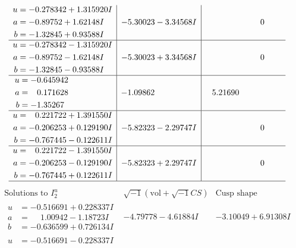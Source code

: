 \documentclass[1p]{elsarticle_modified}
\theoremstyle{definition}
\newcommand{\I}{\sqrt{-1}}
\begin{document}
$$\begin{array}{c|c|c}
\begin{aligned}
u &= -0.278342 + 1.315920 I \\
a &= -0.89752 + 1.62148 I \\
b &= -1.32845 + 0.93588 I\end{aligned}
 & -5.30023 - 3.34568 I & \phantom{-0.000000 } 0 \\ \hline\begin{aligned}
u &= -0.278342 - 1.315920 I \\
a &= -0.89752 - 1.62148 I \\
b &= -1.32845 - 0.93588 I\end{aligned}
 & -5.30023 + 3.34568 I & \phantom{-0.000000 } 0 \\ \hline\begin{aligned}
u &= -0.645942\phantom{ +0.000000I} \\
a &= \phantom{-}0.171628\phantom{ +0.000000I} \\
b &= -1.35267\phantom{ +0.000000I}\end{aligned}
 & -1.09862\phantom{ +0.000000I} & \phantom{-}5.21690\phantom{ +0.000000I} \\ \hline\begin{aligned}
u &= \phantom{-}0.221722 + 1.391550 I \\
a &= -0.206253 + 0.129190 I \\
b &= -0.767445 - 0.122611 I\end{aligned}
 & -5.82323 - 2.29747 I & \phantom{-0.000000 } 0 \\ \hline\begin{aligned}
u &= \phantom{-}0.221722 - 1.391550 I \\
a &= -0.206253 - 0.129190 I \\
b &= -0.767445 + 0.122611 I\end{aligned}
 & -5.82323 + 2.29747 I & \phantom{-0.000000 } 0\\
 \hline 
 \end{array}$$\newpage$$\begin{array}{c|c|c}  
\text{Solutions to }I^u_{2}& \I (\text{vol} + \sqrt{-1}CS) & \text{Cusp shape}\\
 \hline 
\begin{aligned}
u &= -0.516691 + 0.228337 I \\
a &= \phantom{-}1.00942 - 1.18723 I \\
b &= -0.636599 + 0.726134 I\end{aligned}
 & -4.79778 - 4.61884 I & -3.10049 + 6.91308 I \\ \hline\begin{aligned}
u &= -0.516691 - 0.228337 I \\

\end{aligned}
\end{array}$$
\end{document}
